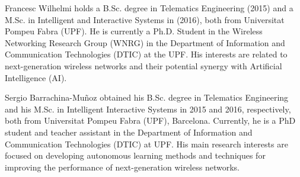 \documentclass[comsoc]{IEEEtran}
\begin{document}
	
	\begin{IEEEbiography}{Francesc Wilhelmi} holds a B.Sc. degree in Telematics Engineering (2015) and a M.Sc. in Intelligent and Interactive Systems in (2016), both from Universitat Pompeu Fabra (UPF). He is currently a Ph.D. Student in the Wireless Networking Research Group (WNRG) in the Department of Information and Communication Technologies (DTIC) at the UPF. His interests are related to next-generation wireless networks and their potential synergy with Artificial Intelligence (AI).
	\end{IEEEbiography}
	
	\begin{IEEEbiography}{Sergio Barrachina-Mu\~noz} obtained his B.Sc. degree in Telematics Engineering and his M.Sc. in Intelligent Interactive Systems in 2015 and 2016, respectively, both from Universitat Pompeu Fabra (UPF), Barcelona. Currently, he is a PhD student and teacher assistant in the Department of Information and Communication Technologies (DTIC) at UPF. His main research interests are focused on developing autonomous learning methods and techniques for improving the performance of next-generation wireless networks.
	\end{IEEEbiography}
	
\end{document}
